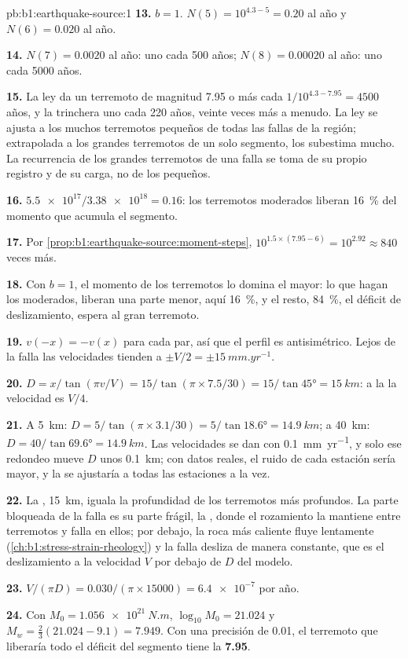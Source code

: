 \begin{solution}{pb:b1:earthquake-source:1}
\textbf{13.} $b = 1$. $N(5) = 10^{4.3 - 5} = 0.20$ al año y $N(6) = 0.020$ al
año.

\textbf{14.} $N(7) = 0.0020$ al año: uno cada 500 años; $N(8) = 0.00020$ al
año: uno cada \num{5000} años.

\textbf{15.} La ley da un terremoto de magnitud 7.95 o más cada
$1/10^{4.3 - 7.95} = \num{4500}$ años, y la trinchera uno cada 220 años, veinte
veces más a menudo. La ley se ajusta a los muchos terremotos pequeños de todas las
fallas de la región; extrapolada a los grandes terremotos de un solo segmento, los
subestima mucho. La recurrencia de los grandes terremotos de una falla se toma de su
propio registro y de su carga, no de los pequeños.

\textbf{16.} $\num{5.5e17}/\num{3.38e18} = 0.16$: los terremotos moderados liberan
\qty{16}{\percent} del momento que acumula el segmento.

\textbf{17.} Por \cref{prop:b1:earthquake-source:moment-steps},
$10^{1.5\times(7.95 - 6)} = 10^{2.92} \approx 840$ veces más.

\textbf{18.} Con $b = 1$, el momento de los terremotos lo domina el mayor: lo que hagan
los moderados, liberan una parte menor, aquí \qty{16}{\percent}, y el resto,
\qty{84}{\percent}, el déficit de deslizamiento, espera al gran terremoto.

\textbf{19.} $v(-x) = -v(x)$ para cada par, así que el perfil es antisimétrico.
Lejos de la falla las velocidades tienden a $\pm V/2 = \pm\qty{15}{mm.yr^{-1}}$.

\textbf{20.} $D = x/\tan(\pi v/V) = 15/\tan(\pi\times7.5/30) = 15/\tan\ang{45} =
\qty{15}{km}$: a la  la velocidad es $V/4$.

\textbf{21.} A \qty{5}{km}: $D = 5/\tan(\pi\times3.1/30) = 5/\tan\ang{18.6} =
\qty{14.9}{km}$; a \qty{40}{km}: $D = 40/\tan\ang{69.6} = \qty{14.9}{km}$. Las
velocidades se dan con \qty{0.1}{mm.yr^{-1}}, y solo ese redondeo mueve $D$ unos
\qty{0.1}{km}; con datos reales, el ruido de cada estación sería mayor, y la
 se ajustaría a todas las estaciones a la vez.

\textbf{22.} La , \qty{15}{km}, iguala la profundidad de los
terremotos más profundos. La parte bloqueada de la falla es su parte frágil, la
, donde el rozamiento la mantiene entre terremotos y falla en ellos; por debajo, la roca más
caliente fluye lentamente (\cref{ch:b1:stress-strain-rheology}) y la falla desliza de manera constante, que es el deslizamiento a la
velocidad $V$ por debajo de $D$ del modelo.

\textbf{23.} $V/(\pi D) = \num{0.030}/(\pi\times\num{15000}) = \num{6.4e-7}$
por año.

\textbf{24.} Con $M_0 = \qty{1.056e21}{N.m}$, $\log_{10}M_0 = 21.024$ y
$M_w = \tfrac23(21.024 - 9.1) = 7.949$. Con una precisión de 0.01, el terremoto que liberaría
todo el déficit del segmento tiene la 
\textbf{7.95}.
\end{solution}
